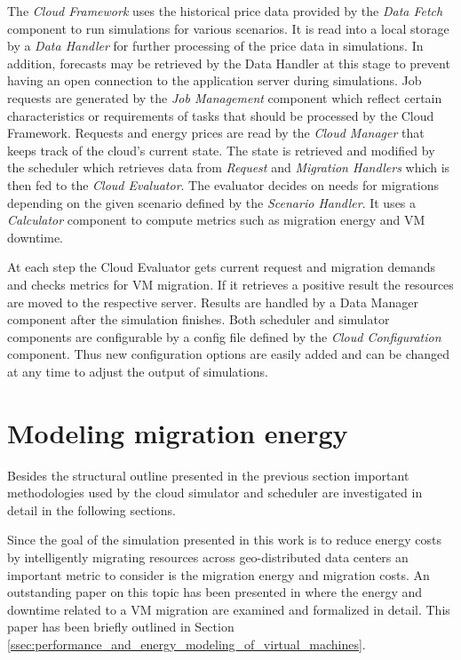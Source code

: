 The \textit{Cloud Framework} uses the historical price data provided by the \textit{Data Fetch} component to run simulations for various scenarios. It is read into a local storage by a \textit{Data Handler} for further processing of the price data in simulations. In addition, forecasts may be retrieved by the Data Handler at this stage to prevent having an open connection to the application server during simulations. Job requests are generated by the \textit{Job Management} component which reflect certain characteristics or requirements of tasks that should be processed by the Cloud Framework. Requests and energy prices are read by the \textit{Cloud Manager} that keeps track of the cloud's current state. The state is retrieved and modified by the scheduler which retrieves data from \textit{Request} and \textit{Migration Handlers} which is then fed to the \textit{Cloud Evaluator}. The evaluator decides on needs for migrations depending on the given scenario defined by the \textit{Scenario Handler}. It uses a \textit{Calculator} component to compute metrics such as migration energy and VM downtime. 

At each step the Cloud Evaluator gets current request and migration demands and checks metrics for VM migration. If it retrieves a positive result the resources are moved to the respective server. Results are handled by a Data Manager component after the simulation finishes. Both scheduler and simulator components are configurable by a config file defined by the \textit{Cloud Configuration} component. Thus new configuration options are easily added and can be changed at any time to adjust the output of simulations. 




\section{Modeling migration energy} \label{sec:modeling_migration_energy}

Besides the structural outline presented in the previous section important methodologies used by the cloud simulator and scheduler are investigated in detail in the following sections. 

Since the goal of the simulation presented in this work is to reduce energy costs by intelligently migrating resources across geo-distributed data centers an important metric to consider is the migration energy and migration costs. An outstanding paper on this topic has been presented in \cite{liu2013performance} where the energy and downtime related to a VM migration are examined and formalized in detail. This paper has been briefly outlined in Section \ref{ssec:performance_and_energy_modeling_of_virtual_machines}. 

